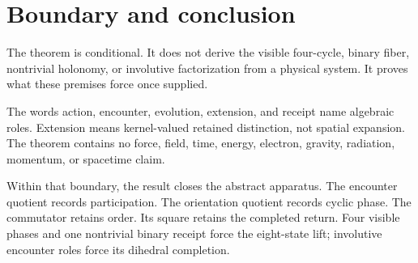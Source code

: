 \section{Boundary and conclusion}

The theorem is conditional. It does not derive the visible four-cycle,
binary fiber, nontrivial holonomy, or involutive factorization from a
physical system. It proves what these premises force once supplied.

The words action, encounter, evolution, extension, and receipt name
algebraic roles. Extension means kernel-valued retained distinction,
not spatial expansion. The theorem contains no force, field, time,
energy, electron, gravity, radiation, momentum, or spacetime claim.

Within that boundary, the result closes the abstract apparatus. The
encounter quotient records participation. The orientation quotient
records cyclic phase. The commutator retains order. Its square retains
the completed return. Four visible phases and one nontrivial binary
receipt force the eight-state lift; involutive encounter roles force
its dihedral completion.
